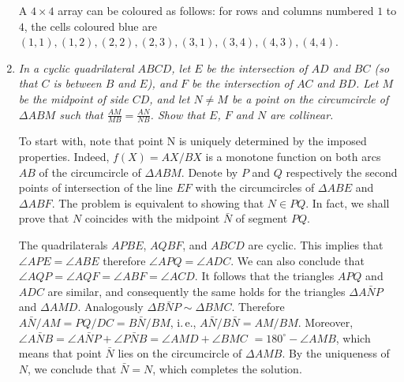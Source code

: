 \documentclass[a4paper,12pt]{article}
\begin{document}
\begin{enumerate}
	A $4\times 4$ array can be coloured as follows: for rows and columns numbered $1$ to $4$, the cells coloured blue are $(1,1),(1,2),(2,2),(2,3),(3,1),(3,4),(4,3),(4,4)$.
	
	\item %
	\textit{In a cyclic quadrilateral $ABCD$, let $E$ be the intersection of $AD$ and $BC$ (so that $C$ is between $B$ and $E$), and $F$ be the intersection of $AC$ and $BD$. Let $M$ be the midpoint of side $CD$, and let $N\neq M$ be a point on the circumcircle of $\Delta ABM$ such that $\frac{AM}{MB}=\frac{AN}{NB}$. Show that $E$, $F$ and $N$ are collinear.}
	
	To start with, note that point N is uniquely determined by the imposed properties. Indeed, $f(X) = AX/BX$ is a monotone function on both arcs $AB$ of the circumcircle of $\Delta ABM$. Denote by $P$ and $Q$ respectively the second points of intersection of the line $EF$ with the circumcircles of $\Delta ABE$ and $\Delta ABF$. The problem is equivalent to showing that $N \in PQ$. In fact, we shall prove that $N$ coincides with the midpoint $\bar{N}$ of segment $PQ$.
	
	
	The quadrilaterals $APBE$, $AQBF$, and $ABCD$ are cyclic. This implies that $\angle APE = \angle ABE$ therefore $\angle APQ = \angle ADC$. We can also conclude that $\angle AQP = \angle AQF = \angle ABF = \angle ACD$. It follows that the triangles $APQ$ and $ADC$ are similar, and consequently the same holds for the triangles $\Delta A\bar{N}P$ and $\Delta AMD$. Analogously $\Delta B\bar{N}P \sim \Delta BMC$. Therefore $A\bar{N}/AM = PQ/DC = B\bar{N}/BM$, i.\,e., $A\bar{N}/B\bar{N} = AM/BM$. Moreover, $\angle A\bar{N}B = \angle A\bar{N}P + \angle P\bar{N}B = \angle AMD + \angle BMC$ $= 180^\circ - \angle AMB$, which means that point $\bar{N}$ lies on the circumcircle of $\Delta AMB$. By
the uniqueness of $N$, we conclude that $\bar{N} = N$, which completes the solution.

\end{enumerate}
\end{document}
